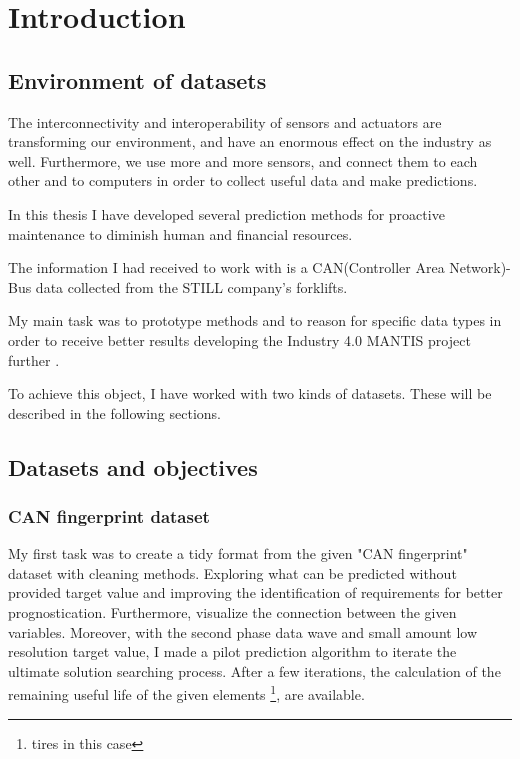 \chapter{Introduction}
\section{Environment of datasets}
The interconnectivity and interoperability \cite{TalebArchInsSys} of sensors and actuators are transforming our environment, and have an enormous effect on the industry as well. Furthermore, we use more and more sensors, and connect them to each other and to computers in order to collect useful data and make predictions.

In this thesis I have developed several prediction methods for proactive maintenance to diminish human and financial resources.

The information I had received to work with is a CAN(Controller Area Network)-Bus data collected from the STILL company's forklifts.

My main task was to prototype methods and to reason for specific data types in order to receive better results developing the Industry 4.0 \cite{Indfourpointzero} MANTIS project further \cite{PaliHCsCPS,HCsCPS2,GartnerIoT,HuangCPS,PaliCPS,HCsCPS,ProMain}.

To achieve this object, I have worked with two kinds of datasets. These will be described in the following sections.
\section{Datasets and objectives}
    \subsection{CAN fingerprint dataset}
\noindent
My first task was to create a tidy format from the given "CAN fingerprint" dataset with cleaning methods. Exploring what can be predicted without provided target value and improving the identification of requirements for better prognostication. Furthermore, visualize the connection between the given variables. Moreover, with the second phase data wave and small amount low resolution target value, I made a pilot prediction algorithm to iterate the ultimate solution searching process. 
\noindent
After a few iterations, the calculation of the remaining useful life of the given elements \footnote{tires in this case}, are available. 
